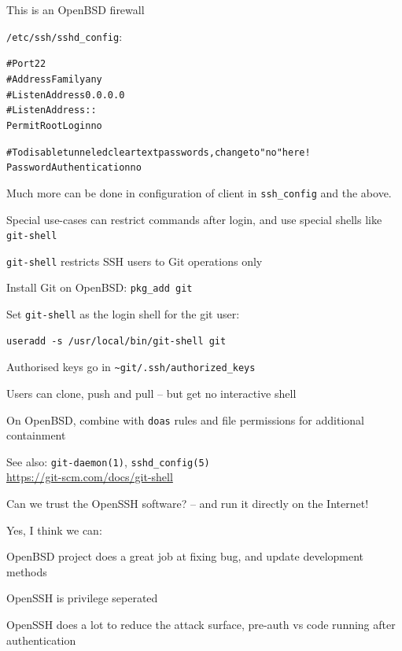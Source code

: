 \documentclass[Screen16to9,17pt]{foils}
\begin{document}
\begin{list2}
\item This is an OpenBSD firewall
\end{list2}


\verb+/etc/ssh/sshd_config+:
\begin{alltt}
#Port 22
#AddressFamily any
#ListenAddress 0.0.0.0
#ListenAddress ::
PermitRootLogin no

# To disable tunneled clear text passwords, change to "no" here!
PasswordAuthentication no
\end{alltt}

Much more can be done in configuration of client in \verb+ssh_config+ and the above.

\begin{list2}
\item Special use-cases can restrict commands after login, and use special shells like \verb+git-shell+
\end{list2}

\begin{list2}
\item \verb+git-shell+ restricts SSH users to Git operations only
\item Install Git on OpenBSD: \verb+pkg_add git+
\item Set \verb+git-shell+ as the login shell for the git user:
\begin{verbatim}
useradd -s /usr/local/bin/git-shell git
\end{verbatim}
\item Authorised keys go in \verb+~git/.ssh/authorized_keys+
\item Users can clone, push and pull -- but get no interactive shell
\item On OpenBSD, combine with \verb+doas+ rules and file permissions
  for additional containment
\item See also: \verb+git-daemon(1)+, \verb+sshd_config(5)+\\
\url{https://git-scm.com/docs/git-shell}
\end{list2}



Can we trust the OpenSSH software? -- and run it directly on the Internet!

Yes, I think we can:
\begin{list2}
\item OpenBSD project does a great job at fixing bug, and update development methods
\item OpenSSH is privilege seperated
\item OpenSSH does a lot to reduce the attack surface, pre-auth vs code running after authentication
\end{list2}
\end{document}
